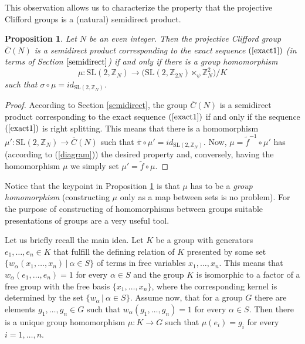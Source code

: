 \documentclass[10pt]{amsart}
\theoremstyle{plain}
\newtheorem{proposition}[theorem]{Proposition}
\theoremstyle{definition}
\theoremstyle{remark}%
\newcommand{\Z}{\mathbb{Z}}
\newcommand{\set}[2]{\{#1\,|\ #2\}}
\newcommand{\SL}{\mathrm{SL}}
\begin{document}
This observation allows us to characterize the property that the projective Clifford groups is a (natural) semidirect product.

\begin{proposition}\label{character_1}
 Let $N$ be an even integer. Then the projective Clifford group $\overline{C}(N)$ is a semidirect product corresponding to the exact sequence $(\ref{exact1})$ (in terms of Section $\ref{semidirect}$) if and only if there is a group homomorphism $$\mu:  \SL(2,\mathbb{Z}_N) \to \big(\SL(2,\Z_{2N})\ltimes_\psi \Z_{N}^2\big)/K$$
 such that  $\sigma\circ\mu=id_{\SL(2,\Z_N)}$.
\end{proposition}
\begin{proof}
 According to Section \ref{semidirect}, the group $\overline{C}(N)$ is a semidirect product corresponding to the exact sequence $(\ref{exact1})$
  if and only if the sequence $(\ref{exact1})$ is right splitting. This means that there is a homomorphism $\mu':\SL(2,\mathbb{Z}_N)\to \overline{C}(N)$ such that $\overline{\pi}\circ\mu'=id_{\SL(2,\Z_N)}$. Now,  $\mu=\widetilde{f}^{-1}\circ \mu'$ has (according to (\ref{diagram})) the desired property and, conversely, having the homomorphism $\mu$ we simply set $\mu'=\widetilde{f}\circ \mu$.
\end{proof}

Notice that the keypoint in Proposition \ref{character_1} is that $\mu$ has to be a \emph{group  homomorphism} (constructing $\mu$ only as a map between sets is no problem). For the purpose of constructing of homomorphisms between groups suitable presentations of groups are a very useful tool. 

Let us briefly recall the main idea. Let $K$ be a group with generators $e_1,\dots,e_n\in K$ that fulfill the defining relation of $K$ presented by some set  $\set{w_{\alpha}(x_1,\dots,x_n)}{\alpha\in S}$ of terms  in free variables $x_1,\dots,x_n$. This means that $w_{\alpha}(e_1,\dots,e_n)=1$ for every $\alpha\in S$ and the group $K$ is isomorphic to a factor of a free group with the free basis $\{x_1,\dots,x_n\}$, where the corresponding kernel  is determined by the set $\set{w_\alpha}{\alpha\in S}$. Assume now, that for a group $G$ there are elements $g_1,\dots,g_n\in G$ such that $w_{\alpha}(g_1,\dots,g_n)=1$ for every $\alpha\in S$. Then there is a unique group homomorphism $\mu:K\to G$ such that $\mu(e_i)=g_i$ for every $i=1,\dots,n$.
\end{document}
